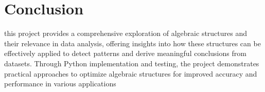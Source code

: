 \documentclass{report}
\begin{document}
\section{Conclusion}
this project provides a comprehensive 
exploration of algebraic structures and
their relevance in data analysis, 
offering insights into how these 
structures can be effectively applied 
to detect patterns and derive meaningful
conclusions from datasets. Through Python 
implementation and testing, the project 
demonstrates practical approaches to 
optimize algebraic structures for 
improved accuracy and performance 
in various applications
    
\end{document}
